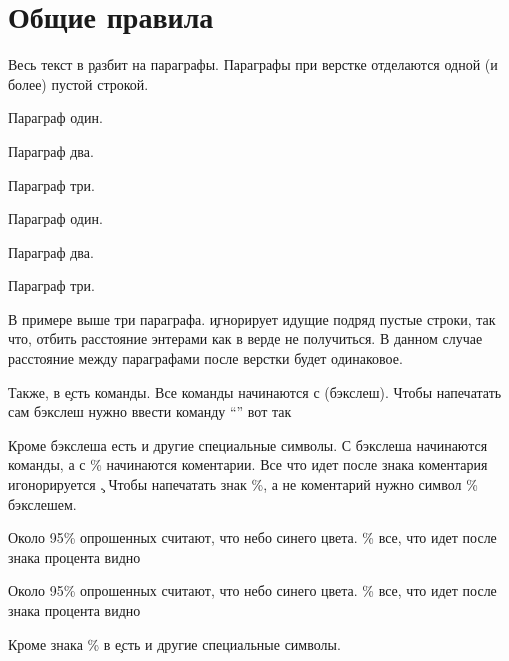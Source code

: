 \chapter{Общие правила}

Весь текст в \c разбит на параграфы. Параграфы при верстке отделаются
одной (и более) пустой строкой.

 \hfill
\startTEX
Параграф один.

Параграф два.


Параграф три.
\stopTEX
\stopdescr

 \hfill
\startCODERESULT
Параграф один.

Параграф два.


Параграф три.
\stopCODERESULT
\stopdescr

В примере выше три параграфа. \c игнорирует идущие подряд пустые строки, так
что, отбить расстояние энтерами как в верде не получиться. В данном случае
расстояние между параграфами после верстки будет одинаковое.

Также, в \c есть команды. Все команды начинаются с \tex{} (бэкслеш). Чтобы
напечатать сам бэкслеш нужно ввести команду ``'' вот так

\vbox{
 \hfill
\startTEX
\tex{}
\stopTEX
\stopdescr
}

\vbox{
 \hfill
\startCODERESULT
\tex{}
\stopCODERESULT
\stopdescr
}

Кроме бэкслеша есть и другие специальные символы. С бэкслеша начинаются команды,
а с \% начинаются коментарии. Все что идет после знака коментария
игонорируется \c. Чтобы напечатать знак \%, а не коментарий
нужно  символ \% бэкслешем.

 \hfill
\startTEX
Около 95\% опрошенных считают, что небо синего цвета.
\% все, что идет после знака процента видно
\stopTEX
\stopdescr

 \hfill
\startCODERESULT
Около 95\% опрошенных считают, что небо синего цвета.
\% все, что идет после знака процента видно
\stopCODERESULT
\stopdescr

Кроме знака \% в \c есть и другие специальные символы.

